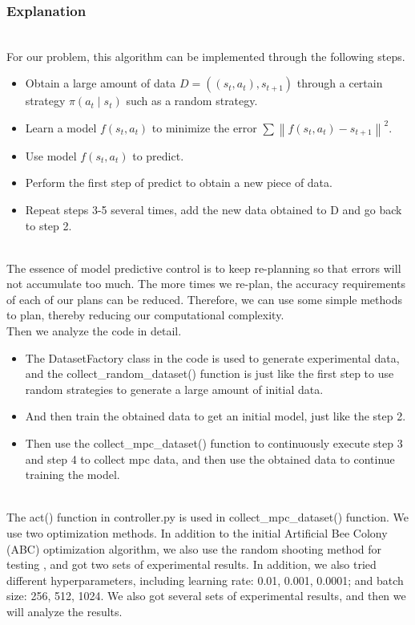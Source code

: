 \documentclass[12pt]{article}
\begin{document}
\subsubsection{Explanation}
~\\\indent For our problem, this algorithm can be implemented through the following steps.
\begin{itemize}
  \item Obtain a large amount of data $D=\left(\left(s_{t}, a_{t}\right), s_{t+1}\right)$ through a certain strategy $\pi\left(a_{t} \mid s_{t}\right)$ such as a random strategy.
  \item Learn a model $f\left(s_{t}, a_{t}\right)$ to minimize the error $\sum\left\|f\left(s_{t}, a_{t}\right)-s_{t+1}\right\|^{2}$.
  \item Use model $f\left(s_{t}, a_{t}\right)$ to predict.
  \item Perform the first step of predict to obtain a new piece of data.
  \item Repeat steps 3-5 several times, add the new data obtained to D and go back to step 2.
\end{itemize}
~\\\indent The essence of model predictive control is to keep re-planning so that errors will not accumulate too much. The more times we re-plan, the accuracy requirements of each of our plans can be reduced. Therefore, we can use some simple methods to plan, thereby reducing our computational complexity.
~\\\indent Then we analyze the code in detail. \\
\begin{itemize}
  \item The DatasetFactory class in the code is used to generate experimental data, and the collect\_random\_dataset() function is just like the first step to use random strategies to generate a large amount of initial data.
  \item And then train the obtained data to get an initial model, just like the step 2.
  \item Then use the collect\_mpc\_dataset() function to continuously execute step 3 and step 4 to collect mpc data, and then use the obtained data to continue training the model.
\end{itemize}

~\\\indent The act() function in controller.py is used in collect\_mpc\_dataset() function. We use two optimization methods. In addition to the initial Artificial Bee Colony (ABC) optimization algorithm, we also use the random shooting method for testing , and got two sets of experimental results. 
In addition, we also tried different hyperparameters, including learning rate: 0.01, 0.001, 0.0001; and batch size: 256, 512, 1024. We also got several sets of experimental results, and then we will analyze the results.
\end{document}
